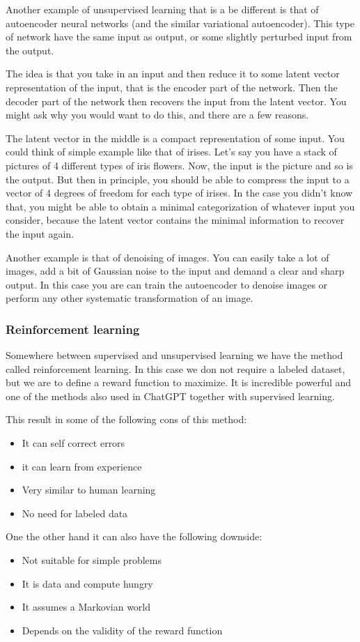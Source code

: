 \documentclass[12pt,a4paper]{article} %
\numberwithin{equation}{section}
\begin{document}
			Another example of unsupervised learning that is a be different is that of autoencoder neural networks (and the similar variational autoencoder). This type of network have the same input as output, or some slightly perturbed input from the output.
			
			The idea is that you take in an input and then reduce it to some latent vector representation of the input, that is the encoder part of the network. Then the decoder part of the network then recovers the input from the latent vector. You might ask why you would want to do this, and there are a few reasons.
			
			The latent vector in the middle is a compact representation of some input. You could think of simple example like that of irises. Let's say you have a stack of pictures of 4 different types of iris flowers. Now, the input is the picture and so is the output. But then in principle, you should be able to compress the input to a vector of 4 degrees of freedom for each type of irises. In the case you didn't know that, you might be able to obtain a minimal categorization of whatever input you consider, because the latent vector contains the minimal information to recover the input again.
			
			Another example is that of denoising of images. You can easily take a lot of images, add a bit of Gaussian noise to the input and demand a clear and sharp output. In this case you are can train the autoencoder to denoise images or perform any other systematic transformation of an image.
		
		\subsubsection{Reinforcement learning}
			Somewhere between supervised and unsupervised learning we have the method called reinforcement learning. In this case we don not require a labeled dataset, but we are to define a reward function to maximize. It is incredible powerful and one of the methods also used in ChatGPT together with supervised learning.
			
			This result in some of the following cons of this method:
			\begin{itemize}
				\item It can self correct errors
				\item it can learn from experience
				\item Very similar to human learning
				\item No need for labeled data
			\end{itemize}
			One the other hand it can also have the following downside:
			\begin{itemize}
				\item Not suitable for simple problems
				\item It is data and compute hungry
				\item It assumes a Markovian world
				\item Depends on the validity of the reward function
			\end{itemize}
		
\end{document}
